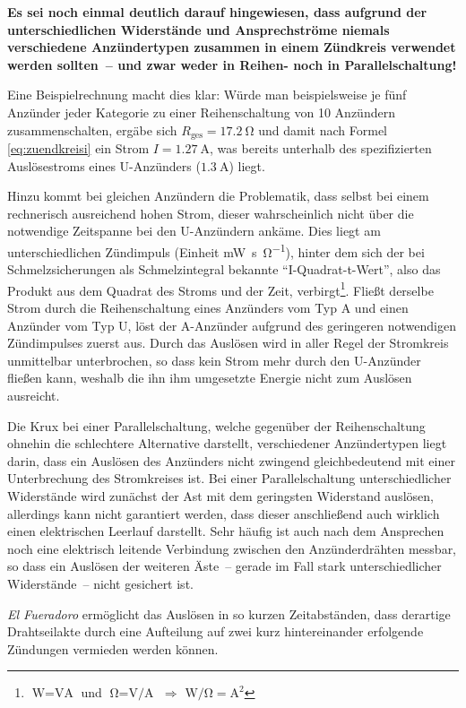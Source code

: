 \documentclass[paper=a4, parskip, numbers=noenddot, toc=listof, headsepline]{scrbook}
\newcommand{\anlage}{\emph{El Fueradoro}}
\begin{document}
			  \textbf{Es sei noch einmal deutlich darauf hingewiesen, dass aufgrund der unterschiedlichen Widerstände und Ansprechströme niemals verschiedene Anzündertypen zusammen in einem Zündkreis verwendet werden sollten~-- und zwar weder in Reihen- noch in Parallelschaltung!}

			  Eine Beispielrechnung macht dies klar: Würde man beispielsweise je fünf Anzünder jeder Kategorie zu einer Reihenschaltung von 10 Anzündern zusammenschalten, ergäbe sich $R_\text{ges} = \SI{17,2}{\ohm}$ und damit nach Formel \eqref{eq:zuendkreisi} ein Strom $I = \SI{1,27}{\ampere}$, was bereits unterhalb des spezifizierten Auslösestroms eines U-Anzünders ($\SI{1,3}{\ampere}$) liegt.

			  Hinzu kommt bei gleichen Anzündern die Problematik, dass selbst bei einem rechnerisch ausreichend hohen Strom, dieser wahrscheinlich nicht über die notwendige Zeitspanne bei den U-Anzündern ankäme. Dies liegt am unterschiedlichen Zündimpuls (Einheit \si{\milli\watt\second\per\ohm}), hinter dem sich der bei Schmelzsicherungen als Schmelzintegral bekannte \enquote{I-Quadrat-t-Wert}, also das Produkt aus dem Quadrat des Stroms und der Zeit, verbirgt\footnote{$\si{\watt} = \si{\volt\ampere}$ und $\si{\ohm} = \si{\volt\per\ampere}$ $\Rightarrow$ $\si{\watt\per\ohm} = \si{\square\ampere}$}. Fließt derselbe Strom durch die Reihenschaltung eines Anzünders vom Typ A und einen Anzünder vom Typ U, löst der A-Anzünder aufgrund des geringeren notwendigen Zündimpulses zuerst aus. Durch das Auslösen wird in aller Regel der Stromkreis unmittelbar unterbrochen, so dass kein Strom mehr durch den U-Anzünder fließen kann, weshalb die ihn ihm umgesetzte Energie nicht zum Auslösen ausreicht.

			  Die Krux bei einer Parallelschaltung, welche gegenüber der Reihenschaltung ohnehin die schlechtere Alternative darstellt, verschiedener Anzündertypen liegt darin, dass ein Auslösen des Anzünders nicht zwingend gleichbedeutend mit einer Unterbrechung des Stromkreises ist. Bei einer Parallelschaltung unterschiedlicher Widerstände wird zunächst der Ast mit dem geringsten Widerstand auslösen, allerdings kann nicht garantiert werden, dass dieser anschließend auch wirklich einen elektrischen Leerlauf darstellt. Sehr häufig ist auch nach dem Ansprechen noch eine elektrisch leitende Verbindung zwischen den Anzünderdrähten messbar, so dass ein Auslösen der weiteren Äste~-- gerade im Fall stark unterschiedlicher Widerstände~-- nicht gesichert ist.

			  {\anlage} ermöglicht das Auslösen in so kurzen Zeitabständen, dass derartige Drahtseilakte durch eine Aufteilung auf zwei kurz hintereinander erfolgende Zündungen vermieden werden können.
\end{document}
